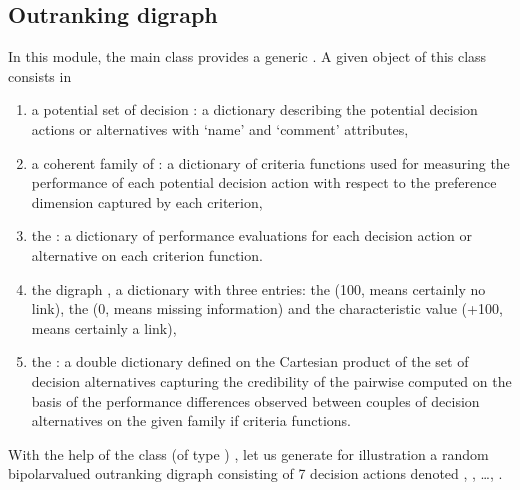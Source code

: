 \documentclass[a4paper,12pt,english]{sphinxhowto}
\begin{document}
\subsection{Outranking digraph}
\label{\detokenize{tutorial:outranking-digraph}}
In this  module, the main  class provides a generic . A given object of this class consists in
\begin{enumerate}
%
\item {} 
a potential set of decision  : a dictionary describing the potential decision actions or alternatives with ‘name’ and ‘comment’ attributes,

\item {} 
a coherent family of : a dictionary of criteria functions used for measuring the performance of each potential decision action with respect to the preference dimension captured by each criterion,

\item {} 
the : a dictionary of performance evaluations for each decision action or alternative on each criterion function.

\item {} 
the digraph , a dictionary with three entries: the  (\sphinxhyphen{}100, means certainly no link), the  (0, means missing information) and the  characteristic value (+100, means certainly a link),

\item {} 
the  : a double dictionary defined on the Cartesian product of the set of decision alternatives capturing the credibility of the pairwise  computed on the basis of the performance differences observed between couples of decision alternatives on the given family if criteria functions.

\end{enumerate}

With the help of the  class (of type ) , let us generate for illustration a random bipolar\sphinxhyphen{}valued outranking digraph consisting of 7 decision actions denoted , , …, .
\end{document}
